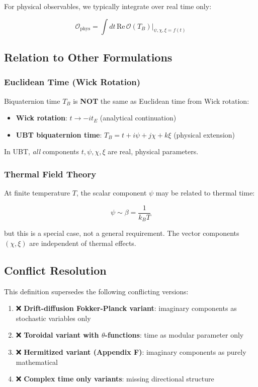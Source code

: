 For physical observables, we typically integrate over real time only:

\begin{equation}
\mathcal{O}_{\text{phys}} = \int dt \, \text{Re}\,\mathcal{O}(T_B)|_{\psi,\chi,\xi=f(t)}
\end{equation}

\subsection{Relation to Other Formulations}

\subsubsection{Euclidean Time (Wick Rotation)}

Biquaternion time $T_B$ is \textbf{NOT} the same as Euclidean time from Wick rotation:

\begin{itemize}
    \item \textbf{Wick rotation}: $t \to -i t_E$ (analytical continuation)
    \item \textbf{UBT biquaternion time}: $T_B = t + i\psi + j\chi + k\xi$ (physical extension)
\end{itemize}

In UBT, \textit{all} components $t, \psi, \chi, \xi$ are real, physical parameters.

\subsubsection{Thermal Field Theory}

At finite temperature $T$, the scalar component $\psi$ may be related to thermal time:

\begin{equation}
\label{eq:canonical:thermal_psi}
\psi \sim \beta = \frac{1}{k_B T}
\end{equation}

but this is a special case, not a general requirement. The vector components $(\chi, \xi)$ are independent of thermal effects.

\subsection{Conflict Resolution}

This definition supersedes the following conflicting versions:

\begin{enumerate}
    \item ❌ \textbf{Drift-diffusion Fokker-Planck variant}: imaginary components as stochastic variables only
    \item ❌ \textbf{Toroidal variant with $\theta$-functions}: time as modular parameter only
    \item ❌ \textbf{Hermitized variant (Appendix F)}: imaginary components as purely mathematical
    \item ❌ \textbf{Complex time only variants}: missing directional structure
\end{enumerate}

